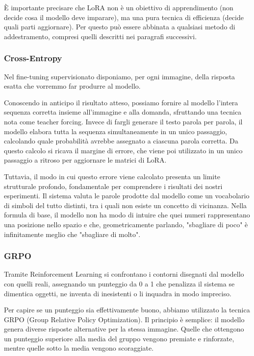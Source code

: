 \noindent
È importante precisare che LoRA non è un obiettivo di apprendimento (non decide cosa il modello deve imparare), ma una pura tecnica di efficienza (decide quali parti aggiornare).
Per questo può essere abbinata a qualsiasi metodo di addestramento, compresi quelli descritti nei paragrafi successivi.

\subsubsection{Cross-Entropy}
Nel fine-tuning supervisionato disponiamo, per ogni immagine, della risposta esatta che vorremmo far produrre al modello.

\noindent
Conoscendo in anticipo il risultato atteso, possiamo fornire al modello l'intera sequenza corretta insieme all'immagine e alla domanda, sfruttando una tecnica nota come teacher forcing.
Invece di fargli generare il testo parola per parola, il modello elabora tutta la sequenza simultaneamente in un unico passaggio, calcolando quale probabilità avrebbe assegnato a ciascuna parola corretta.
Da questo calcolo si ricava il margine di errore, che viene poi utilizzato in un unico passaggio a ritroso per aggiornare le matrici di LoRA.

\noindent
Tuttavia, il modo in cui questo errore viene calcolato presenta un limite strutturale profondo, fondamentale per comprendere i risultati dei nostri esperimenti.
Il sistema valuta le parole prodotte dal modello come un vocabolario di simboli del tutto distinti, tra i quali non esiste un concetto di vicinanza.
Nella formula di base, il modello non ha modo di intuire che quei numeri rappresentano una posizione nello spazio e che, geometricamente parlando, "sbagliare di poco" è infinitamente meglio che "sbagliare di molto".

\subsubsection{GRPO}

Tramite Reinforcement Learning si confrontano i contorni disegnati dal modello con quelli reali, assegnando un punteggio da 0 a 1 che penalizza il sistema se dimentica oggetti, ne inventa di inesistenti o li inquadra in modo impreciso.

\noindent
Per capire se un punteggio sia effettivamente buono, abbiamo utilizzato la tecnica GRPO (Group Relative Policy Optimization). Il principio è semplice: il modello genera diverse risposte alternative per la stessa immagine.
Quelle che ottengono un punteggio superiore alla media del gruppo vengono premiate e rinforzate, mentre quelle sotto la media vengono scoraggiate.


